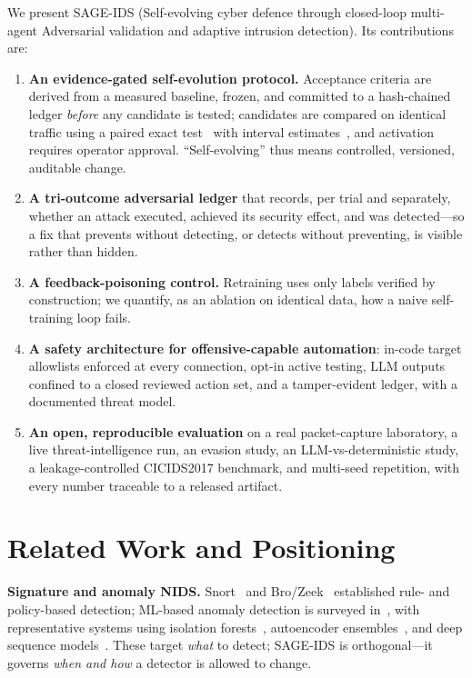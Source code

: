 \documentclass[journal]{IEEEtran}
\newcommand{\sage}{SAGE-IDS}
\begin{document}
We present \sage{} (Self-evolving cyber defence through closed-loop multi-agent Adversarial validation
and adaptive intrusion detection). Its contributions are:

\begin{enumerate}
\item \textbf{An evidence-gated self-evolution protocol.} Acceptance criteria are derived from a
measured baseline, frozen, and committed to a hash-chained ledger \emph{before} any candidate is
tested; candidates are compared on identical traffic using a paired exact
test~\cite{dietterich1998tests} with interval estimates~\cite{wilson1927interval}, and activation
requires operator approval. ``Self-evolving'' thus means controlled, versioned, auditable change.
\item \textbf{A tri-outcome adversarial ledger} that records, per trial and separately, whether an
attack executed, achieved its security effect, and was detected---so a fix that prevents without
detecting, or detects without preventing, is visible rather than hidden.
\item \textbf{A feedback-poisoning control.} Retraining uses only labels verified by construction; we
quantify, as an ablation on identical data, how a naive self-training loop fails.
\item \textbf{A safety architecture for offensive-capable automation}: in-code target allowlists
enforced at every connection, opt-in active testing, LLM outputs confined to a closed reviewed action
set, and a tamper-evident ledger, with a documented threat model.
\item \textbf{An open, reproducible evaluation} on a real packet-capture laboratory, a live
threat-intelligence run, an evasion study, an LLM-vs-deterministic study, a leakage-controlled
CICIDS2017 benchmark, and multi-seed repetition, with every number traceable to a released artifact.
\end{enumerate}

\section{Related Work and Positioning}
\label{sec:related}
\textbf{Signature and anomaly NIDS.} Snort~\cite{roesch1999snort} and Bro/Zeek~\cite{paxson1999bro}
established rule- and policy-based detection; ML-based anomaly detection is surveyed
in~\cite{buczak2016survey}, with representative systems using isolation
forests~\cite{liu2008isolation}, autoencoder ensembles~\cite{mirsky2018kitsune}, and deep sequence
models~\cite{du2017deeplog}. These target \emph{what} to detect; \sage{} is orthogonal---it governs
\emph{when and how} a detector is allowed to change.
\end{document}
